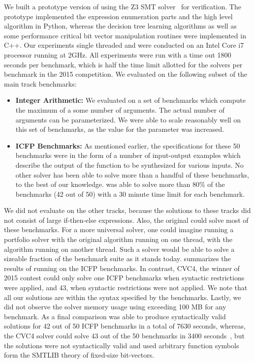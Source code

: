 We built a prototype version of \eusolver using the Z3 SMT
solver~\cite{demoura-08} for verification. The prototype implemented
the expression enumeration parts and the high level algorithm in
Python, whereas the decision tree learning algorithms as well as some
performance critical bit vector manipulation routines were implemented
in C+\!+. Our experiments single threaded and were conducted on
an Intel Core i7 processor running at 2GHz. All experiments were run
with a time out 1800 seconds per benchmark, which is half the time
limit allotted for the solvers per benchmark in the 2015 \sygusbody
competition.  We evaluated \eusolver on the following subset of the
\sygusbody main track benchmarks:
\begin{itemize}
\item
\textbf{Integer Arithmetic:} We evaluated \eusolver on a set of
benchmarks which compute the maximum of a some number of arguments.
The actual number of arguments can be parameterized. We were able to
scale reasonably well on this set of benchmarks, as the value for the
parameter was increased.
\item
\textbf{ICFP Benchmarks:} As mentioned earlier, the specifications for
these 50 benchmarks were in the form of a number of input-output
examples which describe the output of the function to be synthesized
for various inputs. No other solver has been able to solve more than a
handful of these benchmarks, to the best of our knowledge. \eusolver
was able to solve more than 80\% of the benchmarks (42 out of 50) with
a 30 minute time limit for each benchmark.
\end{itemize}

We did not evaluate \eusolver on the other tracks, because the
solutions to these tracks did not consist of large if-then-else
expressions. Also, the original \esolver could solve most of these
benchmarks. For a more universal solver, one could imagine running a
portfolio solver with the original \esolver algorithm running on one
thread, with the \eusolver algorithm running on another thread. Such a
solver would be able to solve a sizeable fraction of the \sygusbody
benchmark suite as it stands today. 
summarizes the results of running \eusolver on the ICFP benchmarks. In
contrast, CVC4, the winner of 2015 \sygusbody contest could only solve one
ICFP benchmarks when syntactic restrictions were applied, and 43, when
syntactic restrictions were not applied. We note that all our
solutions are within the syntax specified by the benchmarks. Lastly,
we did not observe the solver memory usage using exceeding 100 MB for
any benchmark. As a final comparison \eusolver was able to produce
syntactically valid solutions for 42 out of 50 ICFP benchmarks in a
total of 7630 seconds, whereas, the CVC4 solver could solve 43 out of
the 50 benchmarks in 3400 seconds~\cite{reynolds-15}, but the
solutions were not syntactically valid and used arbitrary function
symbols form the SMTLIB theory of fixed-size bit-vectors.

